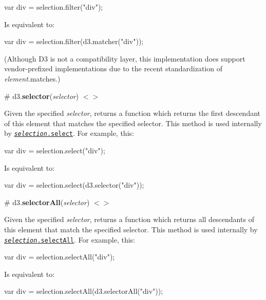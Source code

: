 \begin{DoxyCode}
var div = selection.filter("div");
\end{DoxyCode}


Is equivalent to\+:


\begin{DoxyCode}
var div = selection.filter(d3.matcher("div"));
\end{DoxyCode}


(Although D3 is not a compatibility layer, this implementation does support vendor-\/prefixed implementations due to the recent standardization of {\itshape element}.matches.)

\label{_selector}%
\# d3.{\bfseries selector}({\itshape selector}) \href{https://github.com/d3/d3-selection/blob/master/src/selector.js}{\tt $<$$>$}

Given the specified {\itshape selector}, returns a function which returns the first descendant of {\ttfamily this} element that matches the specified selector. This method is used internally by \href{#selection_select}{\tt {\itshape selection}.select}. For example, this\+:


\begin{DoxyCode}
var div = selection.select("div");
\end{DoxyCode}


Is equivalent to\+:


\begin{DoxyCode}
var div = selection.select(d3.selector("div"));
\end{DoxyCode}


\label{_selectorAll}%
\# d3.{\bfseries selector\+All}({\itshape selector}) \href{https://github.com/d3/d3-selection/blob/master/src/selectAll.js}{\tt $<$$>$}

Given the specified {\itshape selector}, returns a function which returns all descendants of {\ttfamily this} element that match the specified selector. This method is used internally by \href{#selection_selectAll}{\tt {\itshape selection}.select\+All}. For example, this\+:


\begin{DoxyCode}
var div = selection.selectAll("div");
\end{DoxyCode}


Is equivalent to\+:


\begin{DoxyCode}
var div = selection.selectAll(d3.selectorAll("div"));
\end{DoxyCode}


